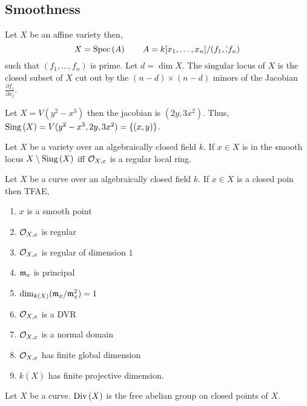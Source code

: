 \documentclass[12pt]{article}
\begin{document}
\subsection{Smoothness}

\begin{definition}
Let $X$ be an affine variety then,
\[ X = \mathrm{Spec}\left( A \right) \quad \quad A = k[x_1, \dots, x_n] / (f_1, \dot, f_n) \]
such that $(f_1, \dots, f_n)$ is prime. Let $d = \dim{X}$. The singular locus of $X$ is the closed subset of $X$ cut out by the $(n - d) \times (n - d)$ minors of the Jacobian $\frac{\partial f_i}{\partial x_j}$.   
\end{definition}


\begin{example}
Let $X = V(y^2 - x^3)$ then the jacobian is $(2 y, 3x^2)$. Thus, $\mathrm{Sing}\left( X \right) = V(y^2 - x^3, 2y, 3 x^2) = \{ (x,y) \} $.
\end{example}

\begin{proposition}
Let $X$ be a variety over an algebraically closed field $k$. If $x \in X$ is in the smooth locus $X \setminus \mathrm{Sing}\left( X \right)$ iff $\mathcal{O}_{X, x}$ is a regular local ring. 
\end{proposition}

\begin{theorem}
Let $X$ be a curve over an algebraically closed field $k$. If $x \in X$ is a closed poin then TFAE,
\begin{enumerate}
\item $x$ is a smooth point
\item $\mathcal{O}_{X, x}$ is regular
\item $\mathcal{O}_{X, x}$ is regular of dimension $1$
\item $\mathfrak{m}_x$ is principal
\item $\dim_{k(X)} (\mathfrak{m}_x / \mathfrak{m}_x^2) = 1$
\item $\mathcal{O}_{X, x}$ is a DVR
\item $\mathcal{O}_{X, x}$ is a normal domain
\item $\mathcal{O}_{X, x}$ has finite global dimension
\item $k(X)$ has finite projective dimension. 
\end{enumerate}
\end{theorem}



\begin{definition}
Let $X$ be a curve. $\mathrm{Div}\left( X \right)$ is the free abelian group on closed points of $X$.
\end{definition}
\end{document}
